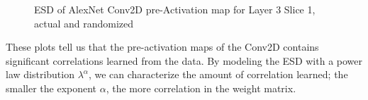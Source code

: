 \begin{figure}[H]
   \centering
   \caption{ESD of AlexNet Conv2D pre-Activation map for Layer 3 Slice 1, actual and randomized}
   \label{fig:alexnet}
\end{figure}


These plots tell us that the pre-activation maps of the Conv2D contains significant correlations learned from the data.  
By modeling the ESD with a power law distribution $\lambda^{\alpha}$, we can characterize the amount of correlation learned;
the smaller the exponent $\alpha$, the more correlation in the weight matrix. 

